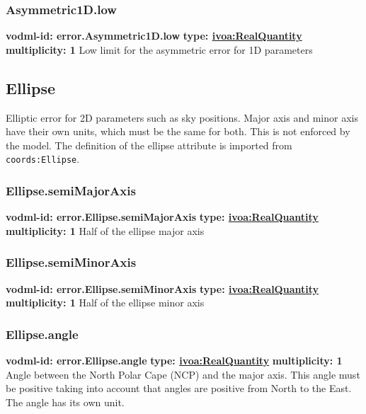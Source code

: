     \subsubsection{Asymmetric1D.low}
      \textbf{vodml-id: error.Asymmetric1D.low} \newline
      \textbf{type: \hyperref[sect:ivoa]{ivoa:RealQuantity}} \newline
      \textbf{multiplicity: 1} \newline
      Low limit for the asymmetric error for 1D parameters

  \subsection{Ellipse}
  \label{sect:error.Ellipse}
    Elliptic error for 2D parameters such as sky positions. Major axis and minor axis have their own units, which must be the same for both. This is not enforced by the model. The definition of the ellipse attribute is imported from \texttt{coords:Ellipse}.

    \subsubsection{Ellipse.semiMajorAxis}
      \textbf{vodml-id: error.Ellipse.semiMajorAxis} \newline
      \textbf{type: \hyperref[sect:ivoa]{ivoa:RealQuantity}} \newline
      \textbf{multiplicity: 1} \newline
      Half of the ellipse major axis

    \subsubsection{Ellipse.semiMinorAxis}
      \textbf{vodml-id: error.Ellipse.semiMinorAxis} \newline
      \textbf{type: \hyperref[sect:ivoa]{ivoa:RealQuantity}} \newline
      \textbf{multiplicity: 1} \newline
      Half of the ellipse minor axis

    \subsubsection{Ellipse.angle}
      \textbf{vodml-id: error.Ellipse.angle} \newline
      \textbf{type: \hyperref[sect:ivoa]{ivoa:RealQuantity}} \newline
      \textbf{multiplicity: 1} \newline
      Angle between the North Polar Cape (NCP) and the major axis. This angle must be positive taking into account that angles are positive from North to the East. The angle has its own unit.


